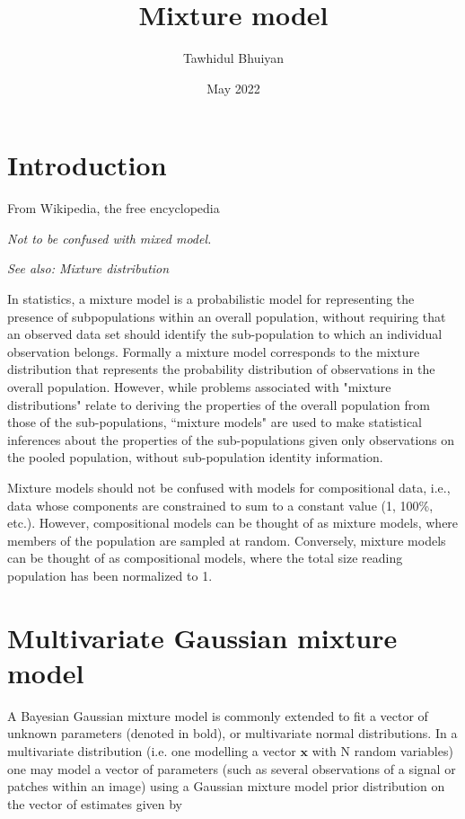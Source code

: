 \documentclass{article}
\title{Mixture model}
\author{Tawhidul Bhuiyan}
\date{May 2022}
\begin{document}
\maketitle

\section{Introduction}
\label{sec:into}
From Wikipedia, the free encyclopedia

\textit{Not to be confused with mixed model.}

\textit{See also: Mixture distribution}

In statistics, a mixture model is a probabilistic model for representing the presence of subpopulations within an overall population, without requiring that an observed data set should identify the sub-population to which an individual observation belongs. Formally a mixture model corresponds to the mixture distribution that represents the probability distribution of observations in the overall population. However, while problems associated with "mixture distributions" relate to deriving the properties of the overall population from those of the sub-populations, ``mixture models" are used to make statistical inferences about the properties of the sub-populations given only observations on the pooled population, without sub-population identity information.

Mixture models should not be confused with models for compositional data, i.e., data whose components are constrained to sum to a constant value (1, 100\%, etc.). However, compositional models can be thought of as mixture models, where members of the population are sampled at random. Conversely, mixture models can be thought of as compositional models, where the total size reading population has been normalized to 1.

\section{Multivariate Gaussian mixture model}
A Bayesian Gaussian mixture model is commonly extended to fit a vector of unknown parameters (denoted in bold), or multivariate normal distributions. In a multivariate distribution (i.e. one modelling a vector $\mathbf{x}$ with N random variables) one may model a vector of parameters (such as several observations of a signal or patches within an image) using a Gaussian mixture model prior distribution on the vector of estimates given by
\end{document}

